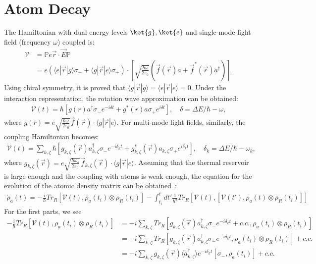 \documentclass[11pt]{article}
\begin{document}
\section{Atom Decay\label{app:atom_decay}}
The Hamiltonian with dual energy levels $\ket{g},\ket{e}$ and single-mode light field (frequency $\omega$) coupled is:
\begin{align}
\mathcal{V} &= \mathbb{P} e \vec{r} \cdot\vec{E} \mathbb{P} \\
&= e  (\langle e|\vec{r}|g\rangle\sigma_- + \langle g|\vec{r}|e\rangle\sigma_+) \cdot [\sqrt{\frac{\hbar \omega }{2\varepsilon_0}}(\vec{f}(\vec{r}) a + \vec{f}^*(\vec{r}) a^\dagger)].
\end{align}
Using chiral symmetry, it is proved that $\langle g|\vec{r}|g\rangle = \langle e|\vec{r}|e\rangle = 0$. Under the interaction representation, the rotation wave approximation can be obtained:
\begin{align}
    \mathcal{V}(t) = \hbar  [g(r) a^\dagger \sigma_{-} e^{-i\delta t} + g^*(r)a \sigma_{+}e^{i\delta t} ],\quad  \delta = \Delta E/\hbar-\omega,
\end{align}
where $g(r) = e\sqrt{\frac{\hbar \omega}{2\varepsilon_0}} \vec{f}(\vec{r}) \cdot \langle g|\vec{r}|e\rangle$. For multi-mode light fields, similarly, the coupling Hamiltonian becomes:
\begin{align}
    \mathcal{V}(t) = \sum_{k,\zeta} \hbar  [g_{k,\zeta}(\vec{r})a_{k,\zeta}^\dagger \sigma_{-} e^{-i\delta_{k} t} + g^*_{k,\zeta}(\vec{r})a_{k,\zeta} \sigma_{+}e^{i\delta_{k} t} ],\quad  \delta_{k} = \Delta E/\hbar-\omega_{k},
\end{align}
where $g_{k,\zeta}(\vec{r}) = e\sqrt{\frac{\hbar \omega_k}{2\varepsilon_0}} \vec{f}_{k,\zeta}(\vec{r}) \cdot \langle g|\vec{r}|e\rangle$. Assuming that the thermal reservoir is large enough and the coupling with atoms is weak enough, the equation for the evolution of the atomic density matrix can be obtained~\cite{Quantumoptics}:
\begin{align}\label{eq:weak-int-reservoir-evol}
\dot\rho_{a}(t) = -\frac{i}{\hbar}Tr_{R} [\mathcal{V}(t), \rho_a(t_i)\otimes\rho_R(t_i)] -\int_{t_i}^t dt' \frac{1}{\hbar^2}Tr_{R} [\mathcal{V}(t), [\mathcal{V}(t'), \rho_a(t)\otimes\rho_R(t_i)]]
\end{align}
For the first parts, we see
\begin{align} 
-\frac{i}{\hbar} Tr_{R}[\mathcal{V}(t), \rho_a(t_i)\otimes\rho_R(t_i)] &=-i \sum_{k,\zeta}  Tr_{R}[g_{k,\zeta}(\vec{r})a_{k,\zeta}^\dagger \sigma_{-} e^{-i\delta_{k} t} + c.c. , \rho_a(t_i)\otimes\rho_R(t_i)] \\
&=-i \sum_{k,\zeta}  Tr_{R}[g_{k,\zeta}(\vec{r})a_{k,\zeta}^\dagger \sigma_{-} e^{-i\delta_{k} t}  , \rho_a(t_i)\otimes\rho_R(t_i)]+c.c. \\
&=-i \sum_{k,\zeta} g_{k,\zeta}(\vec{r})\langle a_{k,\zeta}^\dagger \rangle  e^{-i\delta_{k} t} [\sigma_{-} , \rho_a(t_i)]+c.c. 
\end{align}
\end{document}
